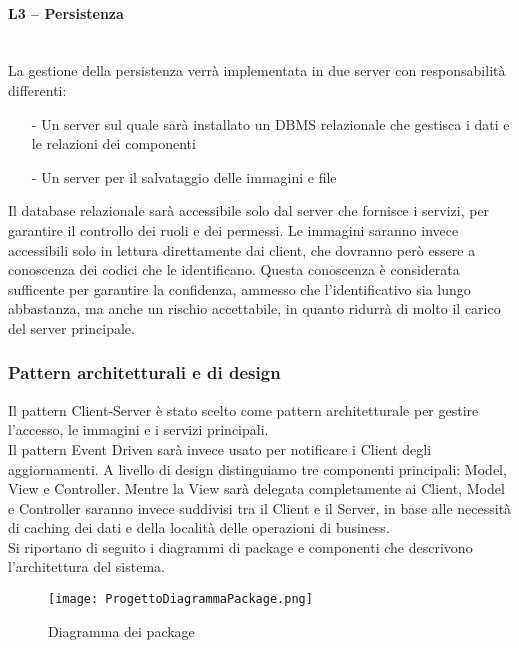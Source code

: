 \paragraph{L3 -- Persistenza}\mbox{}\\
La gestione della persistenza verrà implementata in due server con responsabilità differenti:
\begin{itemize}
    \item[-] Un server sul quale sarà installato un DBMS relazionale che gestisca i dati e le relazioni dei componenti
    \item[-] Un server per il salvataggio delle immagini e file
\end{itemize}

Il database relazionale sarà accessibile solo dal server che fornisce i servizi, per garantire il controllo dei ruoli e dei permessi.
Le immagini saranno invece accessibili solo in lettura direttamente dai client, che dovranno però essere a conoscenza dei codici che le identificano.
Questa conoscenza è considerata sufficente per garantire la confidenza, ammesso che l'identificativo sia lungo abbastanza,
ma anche un rischio accettabile, in quanto ridurrà di molto il carico del server principale.

\subsubsection{Pattern architetturali e di design}

Il pattern Client-Server è stato scelto come pattern architetturale per gestire l'accesso, le immagini e i servizi principali.\\
Il pattern Event Driven sarà invece usato per notificare i Client degli aggiornamenti.
A livello di design distinguiamo tre componenti principali: Model, View e Controller.
Mentre la View sarà delegata completamente ai Client, Model e Controller saranno invece suddivisi tra il Client e il Server,
in base alle necessità di caching dei dati e della località delle operazioni di business.\\
Si riportano di seguito i diagrammi di package e componenti che descrivono l'architettura del sistema.\\
\newpage
\begin{figure}[h!]
    \begin{center}
        \texttt{[image: ProgettoDiagrammaPackage.png]}
        \caption{Diagramma dei package}
    \end{center}
\end{figure}

